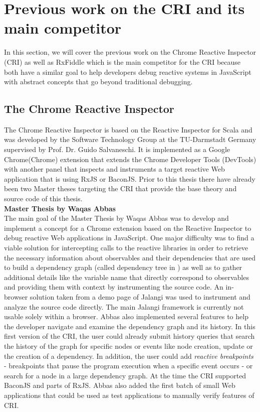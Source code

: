 \section{Previous work on the CRI and its main competitor}
In this section, we will cover the previous work on the Chrome Reactive Inspector (CRI) as well as RxFiddle which is the main competitor for the CRI because both have a similar goal to help developers debug reactive systems in JavaScript with abstract concepts that go beyond traditional debugging.

	\subsection{The Chrome Reactive Inspector}
	\label{sec:PreviousCRI}
	The Chrome Reactive Inspector is based on the Reactive Inspector for Scala \cite{ReactiveInspector} and was developed by the Software Technology Group at the TU-Darmstadt Germany supervised by Prof. Dr. Guido Salvaneschi. It is implemented as a Google Chrome(Chrome) extension that extends the Chrome Developer Tools (DevTools) with another panel that inspects and instruments a target reactive Web application that is using RxJS or BaconJS. Prior to this thesis there have already been two Master theses targeting the CRI that provide the base theory and source code of this thesis.\\
	
	\textbf{Master Thesis by Waqas Abbas}\\
	
	\cite{ThesisAbbas} The main goal of the Master Thesis by Waqas Abbas was to develop and implement a concept for a Chrome extension based on the Reactive Inspector to debug reactive Web applications in JavaScript. One major difficulty was to find a viable solution for intercepting calls to the reactive libraries in order to retrieve the necessary information about observables and their dependencies that are used to build a dependency graph (called dependency tree in \cite{ReactiveInspector}) as well as to gather additional details like the variable name that directly correspond to observables and providing them with context by instrumenting the source code. An in-browser solution taken from a demo page \cite{JalangiDemo} of Jalangi was used to instrument and analyze the source code directly. The main Jalangi framework \cite{Jalangi} is currently not usable solely within a browser.
	Abbas also implemented several features to help the developer navigate and examine the dependency graph and its history. In this first version of the CRI, the user could already submit history queries that search the history of the graph for specific nodes or events like node creation, update or the creation of a dependency. In addition, the user could add \emph{reactive breakpoints} - breakpoints that pause the program execution when a specific event occurs - or search for a node in a large dependency graph.
	At the time the CRI supported BaconJS\cite{BaconJS} and parts of RxJS\cite{RxJS}. Abbas also added the first batch of small Web applications that could be used as test applications to manually verify features of CRI.\\		
		

